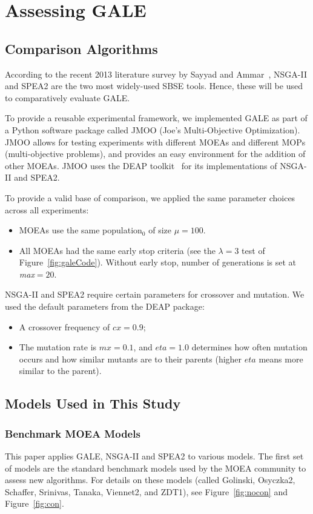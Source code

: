 \documentclass[10pt,journal,compsoc]{IEEEtran}
\newcommand{\bi}{\begin{itemize}}
\newcommand{\ei}{\end{itemize}}
\newcommand{\fig}[1]{Figure~\ref{fig:#1}}
\begin{document}
\section{Assessing GALE}

\subsection{Comparison Algorithms}
According to the recent 2013 literature survey by Sayyad and Ammar~\cite{sayyad13c}, 
NSGA-II and SPEA2 are the two most widely-used SBSE tools.
Hence, these will be used to comparatively evaluate GALE.

To provide a reusable experimental framework, we
implemented GALE as part of a Python software
package called JMOO (Joe's Multi-Objective
Optimization).  JMOO allows for
testing experiments with different MOEAs and
different MOPs (multi-objective problems), and
provides an easy environment for the addition of
other MOEAs.  
JMOO uses the DEAP
toolkit~\cite{jmlr12} for its
implementations of  NSGA-II and SPEA2.

To provide a valid base of comparison, we applied
the same parameter choices across all
experiments:
\bi
\item
MOEAs use the same
population$_0$ of size $\mu=100$.
\item All MOEAs had the same early
stop criteria (see the
$\lambda=3$ test of \fig{galeCode}).
Without early stop, 
number of generations is set at {\em max}$=20$.
\ei

NSGA-II and SPEA2 require certain
 parameters for crossover and
mutation. We used the default parameters from the DEAP
package:
\bi
\item A crossover frequency of  $cx=0.9$;
\item The mutation rate is $mx=0.1$, and $eta=1.0$ determines how often
mutation occurs and how similar mutants are to their
parents (higher $eta$ means more similar to the
parent).
\ei
\subsection{Models Used in This Study}
\subsubsection{Benchmark MOEA Models}
This paper applies GALE, NSGA-II and SPEA2 to various models.
The first  set of models are the standard benchmark
 models used by the MOEA
community to assess new algorithms.
For details on these models (called Golinski, Osyczka2, Schaffer,
Srinivas, Tanaka, Viennet2, and ZDT1), see \fig{nocon} and \fig{con}.
\end{document}

